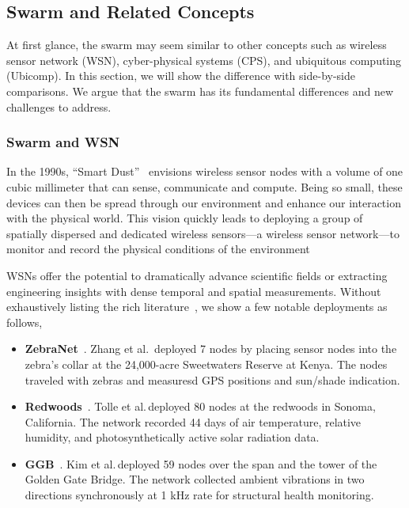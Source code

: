 \subsection{Swarm and Related Concepts}
\label{sec:swarm-relat-conc}

At first glance, the swarm may seem similar to other concepts such as wireless
sensor network (WSN), cyber-physical systems (CPS), and ubiquitous computing
(Ubicomp). In this section, we will show the difference with side-by-side
comparisons. We argue that the swarm has its fundamental differences and new
challenges to address.

\subsubsection{Swarm and WSN}
\label{sec:swarm-wsn}

In the 1990s, ``Smart Dust''~\cite{kahn1999next} envisions wireless sensor nodes
with a volume of one cubic millimeter that can sense, communicate and
compute. Being so small, these devices can then be spread through our
environment and enhance our interaction with the physical world. This vision
quickly leads to deploying a group of spatially dispersed and dedicated wireless
sensors---a wireless sensor network---to monitor and record the physical
conditions of the environment

WSNs offer the potential to dramatically advance scientific fields or extracting
engineering insights with dense temporal and spatial measurements. Without
exhaustively listing the rich literature~\cite{akyildiz2002wireless,
  zhao2009wireless}, we show a few notable deployments as follows,

\begin{itemize}[itemsep=5pt]
\item \textbf{ZebraNet}~\cite{zhang2005habitat}. Zhang et al.\, deployed 7 nodes
  by placing sensor nodes into the zebra's collar at the 24,000-acre Sweetwaters
  Reserve at Kenya. The nodes traveled with zebras and measuresd GPS positions
  and sun/shade indication.
\item \textbf{Redwoods}~\cite{tolle2005macroscope}. Tolle et al.\,deployed 80
  nodes at the redwoods in Sonoma, California. The network recorded 44 days of
  air temperature, relative humidity, and photosynthetically active solar
  radiation data.
\item \textbf{GGB}~\cite{kim2007health}. Kim et al.\,deployed 59 nodes over the
  span and the tower of the Golden Gate Bridge. The network collected ambient
  vibrations in two directions synchronously at 1 kHz rate for structural health
  monitoring.
\end{itemize}

